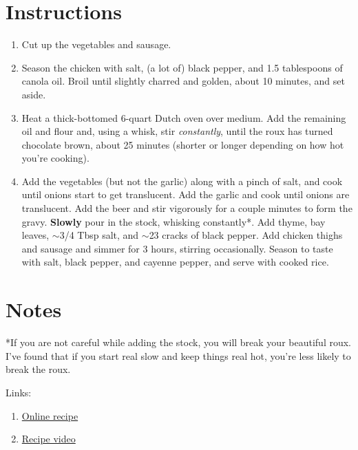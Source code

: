 \documentclass[11pt]{article}
\begin{document}
	\section*{Instructions}
	\begin{enumerate}
		\item Cut up the vegetables and sausage.
		\item Season the chicken with salt, (a lot of) black pepper, and 1.5 tablespoons of canola oil. Broil until slightly charred and golden, about 10 minutes, and set aside.
		\item Heat a thick-bottomed 6-quart Dutch oven over medium. Add the remaining oil and flour and, using a whisk, stir \textit{constantly}, until the roux has turned chocolate brown, about 25 minutes (shorter or longer depending on how hot you're cooking).
		\item Add the vegetables (but not the garlic) along with a pinch of salt, and cook until onions start to get translucent. Add the garlic and cook until onions are translucent. Add the beer and stir vigorously for a couple minutes to form the gravy. \textbf{Slowly} pour in the stock, whisking constantly*. Add thyme, bay leaves, $\sim$3/4 Tbsp salt, and $\sim$23 cracks of black pepper. Add chicken thighs and sausage and simmer for 3 hours, stirring occasionally. Season to taste with salt, black pepper, and cayenne pepper, and serve with cooked rice.
	\end{enumerate}

	\section*{Notes}
	*If you are not careful while adding the stock, you will break your beautiful roux. I've found that if you start real slow and keep things real hot, you're less likely to break the roux.

	Links:
	\begin{enumerate}
		\item \href{https://www.vice.com/en/article/z489zy/chicken-and-andouille-sausage-gumbo}{Online recipe} %
		\item \href{https://www.youtube.com/watch?v=76JXtB7JFQY}{Recipe video}
	\end{enumerate}
\end{document}
